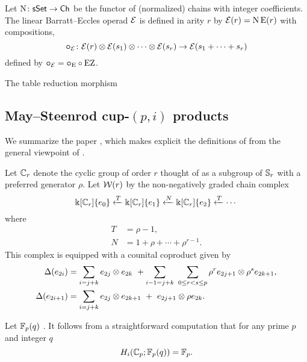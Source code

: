 \sssec

Let $\operatorname{N} \colon \mathsf{sSet} \to \mathsf{Ch}$ be the functor of (normalized) chains with integer coefficients.
The linear Barratt--Eccles operad $\mathcal{E}$ is defined in arity $r$ by $\mathcal{E}(r) = \operatorname{N}\mathrm{E}(r)$ with compositions,
\[
\bm{\circ}_{\mathcal{E}} \colon \mathcal{E}(r) \otimes \mathcal{E}(s_1) \otimes\dotsb\otimes \mathcal{E}(s_r) \to \mathcal{E}(s_1+\dots+s_r)
\]
defined by $\bm{\circ}_{\mathcal{E}} = \bm{\circ}_{\mathrm{E}} \circ \operatorname{EZ}$.

\sssec

The table reduction morphism \TBW

\subsection{May--Steenrod cup-$(p,i)$ products}

We summarize the paper \cite{medina2021may_st}, which makes explicit the definitions of \cite{steenrod1953cyclic} from the general viewpoint of \cite{may1970general}.

\sssec

Let $\mathbb{C}_r$ denote the cyclic group of order $r$ thought of as a subgroup of $\mathbb{S}_r$ with a preferred generator $\rho$.
Let $\mathcal{W}(r)$ by the non-negatively graded chain complex
\begin{equation} \label{eq: minimal resolution}
	\Bbbk[\mathbb{C}_r]\{e_0\} \xleftarrow{T} \Bbbk[\mathbb{C}_r]\{e_1\} \xleftarrow{N} \Bbbk[\mathbb{C}_r]\{e_2\} \xleftarrow{T} \cdots
\end{equation}
where
\begin{equation} \label{eq: T and R definition}
	\begin{split}
		T &= \rho - 1, \\
		N &= 1 + \rho + \cdots + \rho^{r-1}.
	\end{split}
\end{equation}
This complex is equipped with a counital coproduct given by
\begin{align*}
	\Delta(e_{2i}) &=
	\sum_{i=j+k} e_{2j} \otimes e_{2k} \ + \sum_{i-1=j+k} \ \sum_{0 \leq r < s \leq p} \rho^r e_{2j+1} \otimes \rho^s e_{2k+1}, \\
	\Delta(e_{2i+1}) &=
	\sum_{i=j+k} e_{2j} \otimes e_{2k+1} \ +\ e_{2j+1} \otimes \rho e_{2k}.
\end{align*}

\sssec

Let ${\mathbb{F}_p}(q)$ \TBW.
It follows from a straightforward computation that for any prime $p$ and integer $q$
\begin{equation*}
	H_i(\mathbb{C}_p; {\mathbb{F}_p}(q)) = {\mathbb{F}_p}.
\end{equation*}

